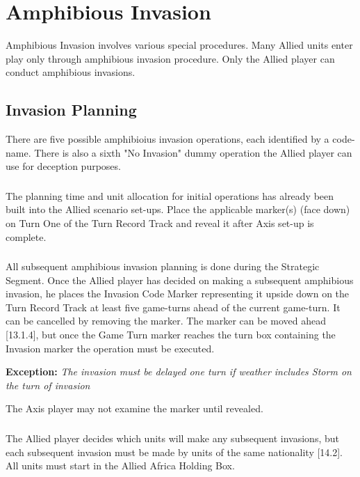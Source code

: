 \section{Amphibious Invasion}

Amphibious Invasion involves various special procedures. Many Allied units enter play only through amphibious invasion procedure. Only the Allied player can conduct amphibious invasions.

\subsection{Invasion Planning}

There are five possible amphibioius invasion operations, each identified by a code-name. There is also a sixth "No Invasion" dummy operation the Allied player can use for deception purposes.

\subsubsection{} The planning time and unit allocation for initial operations has already been built into the Allied scenario set-ups. Place the applicable marker(s) (face down) on Turn One of the Turn Record Track and reveal it after Axis set-up is complete.

\subsubsection{} All subsequent amphibious invasion planning is done during the Strategic Segment. Once the Allied player has decided on making a subsequent amphibious invasion, he places the Invasion Code Marker representing it upside down on the Turn Record Track at least five game-turns ahead of the current game-turn. It can be cancelled by removing the marker. The marker can be moved ahead [13.1.4], but once the Game Turn marker reaches the turn box containing the Invasion marker the operation must be executed.

\textbf{Exception:} \textit{The invasion must be delayed one turn if weather includes Storm on the turn of invasion}

The Axis player may not examine the marker until revealed.

\subsubsection{} The Allied player decides which units will make any subsequent invasions, but each subsequent invasion must be made by units of the same nationality [14.2]. All units must start in the Allied Africa Holding Box.

